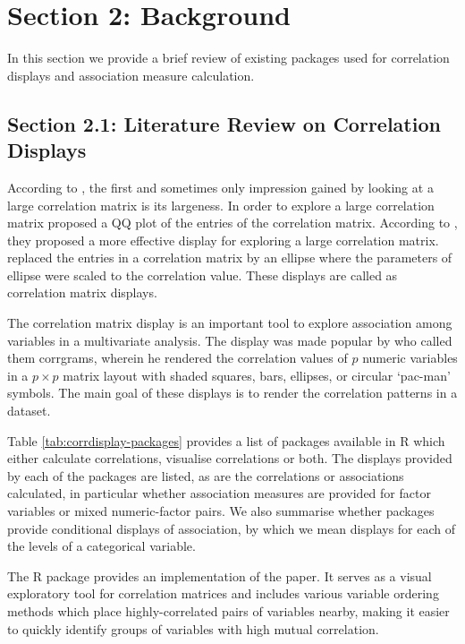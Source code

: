 \hypertarget{section-2-background}{%
\section{Section 2: Background}\label{section-2-background}}

In this section we provide a brief review of existing packages used for
correlation displays and association measure calculation.

\hypertarget{section-2.1-literature-review-on-correlation-displays}{%
\subsection{Section 2.1: Literature Review on Correlation
Displays}\label{section-2.1-literature-review-on-correlation-displays}}

According to \citet{hills1969looking}, the first and sometimes only
impression gained by looking at a large correlation matrix is its
largeness. In order to explore a large correlation matrix
\citet{hills1969looking} proposed a QQ plot of the entries of the
correlation matrix. According to \citet{murdoch1996graphical}, they
proposed a more effective display for exploring a large correlation
matrix. \citet{murdoch1996graphical} replaced the entries in a
correlation matrix by an ellipse where the parameters of ellipse were
scaled to the correlation value. These displays are called as
correlation matrix displays.

The correlation matrix display is an important tool to explore
association among variables in a multivariate analysis. The display was
made popular by \citet{friendly2002corrgrams} who called them corrgrams,
wherein he rendered the correlation values of \(p\) numeric variables in
a \(p \times p\) matrix layout with shaded squares, bars, ellipses, or
circular `pac-man' symbols. The main goal of these displays is to render
the correlation patterns in a dataset.

Table \ref{tab:corrdisplay-packages} provides a list of packages
available in R which either calculate correlations, visualise
correlations or both. The displays provided by each of the packages are
listed, as are the correlations or associations calculated, in
particular whether association measures are provided for factor
variables or mixed numeric-factor pairs. We also summarise whether
packages provide conditional displays of association, by which we mean
displays for each of the levels of a categorical variable.

The R package  \citep{corrplot2021} provides an
implementation of the \citet{friendly2002corrgrams} paper. It serves as
a visual exploratory tool for correlation matrices and includes various
variable ordering methods which place highly-correlated pairs of
variables nearby, making it easier to quickly identify groups of
variables with high mutual correlation.

